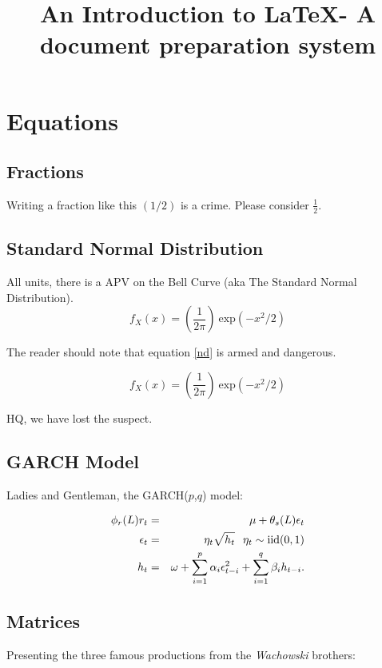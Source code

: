 \documentclass[11pt]{article}
\title{An Introduction to \LaTeX - A document preparation system}
\author{}
\date{}
\begin{document}
\maketitle


\section{Equations}

\subsection{Fractions}
Writing a fraction like this $(1/2)$ is a crime. Please consider $\frac{1}{2}$.


\subsection{Standard Normal Distribution}
All units, there is a APV on the Bell Curve (aka The Standard Normal Distribution).
\begin{equation} \label{nd}
f_{X}(x) = \left(\frac{1}{2\pi}\right) \  \textrm{exp}(-x^2/2)
\end{equation}

The reader should note that equation \ref{nd} is armed and dangerous.

\begin{equation*} 
f_{X}(x) = \left(\frac{1}{2\pi}\right) \  \textrm{exp}(-x^2/2) 
\end{equation*}

HQ, we have lost the suspect.

\subsection{GARCH Model}
Ladies and Gentleman, the GARCH($p$,$q$) model:

\begin{eqnarray}
\phi_{r}(L) r_{t} &=& \mu + \theta_{s}(L) \epsilon_{t} \label{arma} \\ 
\epsilon_{t} &=& \eta_{t} \sqrt{h_{t}} \hspace{0.25cm} \eta_{t} \sim \textrm{iid}(0,1) \label{errorterm}  \\
h_{t} &=& \omega + \sum^{p}_{i=1}\alpha_{i}\epsilon^{2}_{t-i} + \sum^{q}_{i=1}\beta_{i}h_{t-i}\label{garch}.
\end{eqnarray}


\subsection{Matrices}
Presenting the three famous productions from the \emph{Wachowski} brothers:
\end{document}
